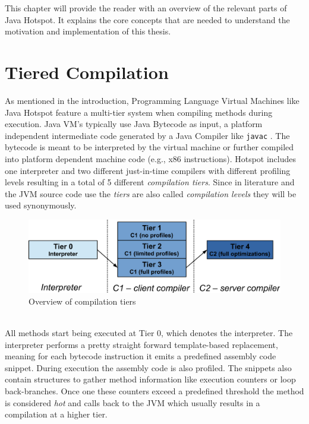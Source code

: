 This chapter will provide the reader with an overview of the relevant parts of Java Hotspot. It explains the core concepts that are needed to understand the motivation and implementation of this thesis.

\section{Tiered Compilation}
\label{sec:tiered}
As mentioned in the introduction, Programming Language Virtual Machines like Java Hotspot feature a multi-tier system when compiling methods during execution. 
Java VM's typically use Java Bytecode as input, a platform independent intermediate code generated by a Java Compiler like \texttt{javac} \cite{javac}.
The bytecode is meant to be interpreted by the virtual machine or further compiled into platform dependent machine code (e.g., x86 instructions).
Hotspot includes one interpreter and two different just-in-time compilers with different profiling levels resulting in a total of 5 different \textit{compilation tiers}. Since in literature and the JVM source code use the \textit{tiers} are also called \textit{compilation levels} they will be used synonymously. 
\begin{figure}[ht]
  \begin{center}
    \centering
    \includegraphics{figures/hs_tiers.png}
    \caption{Overview of compilation tiers}
    \label{f:hs_tiers}
  \end{center}
\end{figure}
\\
All methods start being executed at Tier 0, which denotes the interpreter.
The interpreter performs a pretty straight forward template-based replacement, meaning for each bytecode instruction it emits a predefined assembly code snippet.
During execution the assembly code is also profiled. The snippets also contain structures to gather method information like execution counters or loop back-branches. Once one these counters exceed a predefined threshold the method is considered \textit{hot} and calls back to the JVM which usually results in a compilation at a higher tier.
